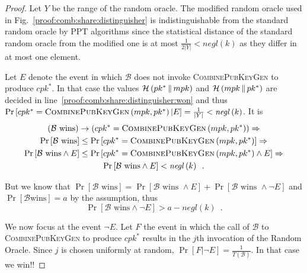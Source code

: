 \begin{proof}
      Let $Y$ be the range of the random oracle. The modified random oracle used
      in Fig.~\ref{proof:comb:share:distinguisher} is indistinguishable from the
      standard random oracle by PPT algorithms since the statistical distance of
      the standard random oracle from the modified one is at most
      $\frac{1}{2|Y|} < \mathit{negl}\left(k\right)$ as they differ in at most
      one element.

      Let $E$ denote the event in which $\mathcal{B}$ does not invoke
      \textsc{CombinePubKeyGen} to produce $cpk^*$. In that case the values
      $\mathcal{H}\left(pk^* \,\|\, mpk\right)$ and $\mathcal{H}\left(mpk
      \,\|\, pk^*\right)$ are decided in
      line~\ref{proof:comb:share:distinguisher:won} and thus $\Pr\left[cpk^* =
      \textsc{CombinePubKeyGen}\left(mpk, pk^*\right) | E\right] = \frac{1}{|Y|}
      < \mathit{negl}\left(k\right)$. It is
      \begin{gather*}
        \left(\mathcal{B} \text{ wins}\right) \rightarrow \left(cpk^* =
        \textsc{CombinePubKeyGen}\left(mpk, pk^*\right)\right) \Rightarrow \\
        \Pr\left[\mathcal{B} \text{ wins}\right] \leq \Pr\left[cpk^* =
        \textsc{CombinePubKeyGen}\left(mpk, pk^*\right)\right] \Rightarrow \\
        \Pr\left[\mathcal{B} \text{ wins} \wedge E\right] \leq \Pr\left[cpk^* =
        \textsc{CombinePubKeyGen}\left(mpk, pk^*\right) \wedge E\right]
        \Rightarrow \\
        \Pr\left[\mathcal{B} \text{ wins} \wedge E\right] <
        \mathit{negl}\left(k\right) \enspace.
      \end{gather*}

      But we know that $\Pr\left[\mathcal{B} \text{ wins}\right] =
      \Pr\left[\mathcal{B} \text{ wins } \wedge E\right] + \Pr\left[\mathcal{B}
      \text{ wins } \wedge \neg E\right]$ and $\Pr\left[\mathcal{B} \text{
      wins}\right] = a$ by the assumption, thus
      \begin{equation}
        \label{proof:comb:share:nohash}
        \Pr\left[\mathcal{B} \text{ wins} \wedge \neg E\right] > a -
        \mathit{negl}\left(k\right) \enspace.
      \end{equation}

      We now focus at the event $\neg E$. Let $F$ the event in which the call of
      $\mathcal{B}$ to \textsc{CombinePubKeyGen} to produce $cpk^*$ results in
      the $j$th invocation of the Random Oracle. Since $j$ is chosen uniformly
      at random, $\Pr\left[F | \neg E\right] =
      \frac{1}{T\left(\mathcal{B}\right)}$. In that case we win!! %
    \end{proof}

